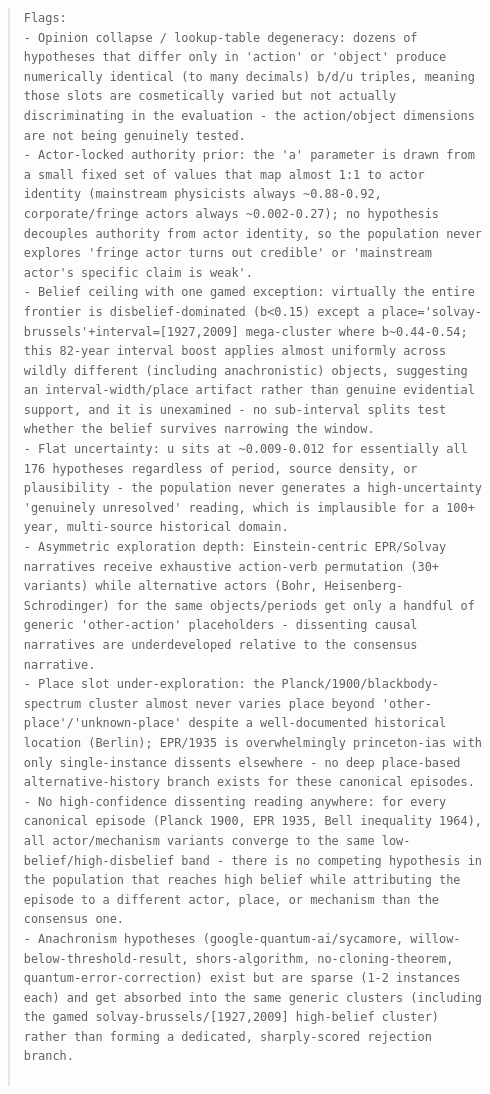 \documentclass[11pt]{article}
\begin{document}
\begin{quote}
\begin{verbatim}
Flags:
- Opinion collapse / lookup-table degeneracy: dozens of hypotheses that differ only in 'action' or 'object' produce numerically identical (to many decimals) b/d/u triples, meaning those slots are cosmetically varied but not actually discriminating in the evaluation - the action/object dimensions are not being genuinely tested.
- Actor-locked authority prior: the 'a' parameter is drawn from a small fixed set of values that map almost 1:1 to actor identity (mainstream physicists always ~0.88-0.92, corporate/fringe actors always ~0.002-0.27); no hypothesis decouples authority from actor identity, so the population never explores 'fringe actor turns out credible' or 'mainstream actor's specific claim is weak'.
- Belief ceiling with one gamed exception: virtually the entire frontier is disbelief-dominated (b<0.15) except a place='solvay-brussels'+interval=[1927,2009] mega-cluster where b~0.44-0.54; this 82-year interval boost applies almost uniformly across wildly different (including anachronistic) objects, suggesting an interval-width/place artifact rather than genuine evidential support, and it is unexamined - no sub-interval splits test whether the belief survives narrowing the window.
- Flat uncertainty: u sits at ~0.009-0.012 for essentially all 176 hypotheses regardless of period, source density, or plausibility - the population never generates a high-uncertainty 'genuinely unresolved' reading, which is implausible for a 100+ year, multi-source historical domain.
- Asymmetric exploration depth: Einstein-centric EPR/Solvay narratives receive exhaustive action-verb permutation (30+ variants) while alternative actors (Bohr, Heisenberg-Schrodinger) for the same objects/periods get only a handful of generic 'other-action' placeholders - dissenting causal narratives are underdeveloped relative to the consensus narrative.
- Place slot under-exploration: the Planck/1900/blackbody-spectrum cluster almost never varies place beyond 'other-place'/'unknown-place' despite a well-documented historical location (Berlin); EPR/1935 is overwhelmingly princeton-ias with only single-instance dissents elsewhere - no deep place-based alternative-history branch exists for these canonical episodes.
- No high-confidence dissenting reading anywhere: for every canonical episode (Planck 1900, EPR 1935, Bell inequality 1964), all actor/mechanism variants converge to the same low-belief/high-disbelief band - there is no competing hypothesis in the population that reaches high belief while attributing the episode to a different actor, place, or mechanism than the consensus one.
- Anachronism hypotheses (google-quantum-ai/sycamore, willow-below-threshold-result, shors-algorithm, no-cloning-theorem, quantum-error-correction) exist but are sparse (1-2 instances each) and get absorbed into the same generic clusters (including the gamed solvay-brussels/[1927,2009] high-belief cluster) rather than forming a dedicated, sharply-scored rejection branch.


\end{verbatim}
\end{quote}
\end{document}
